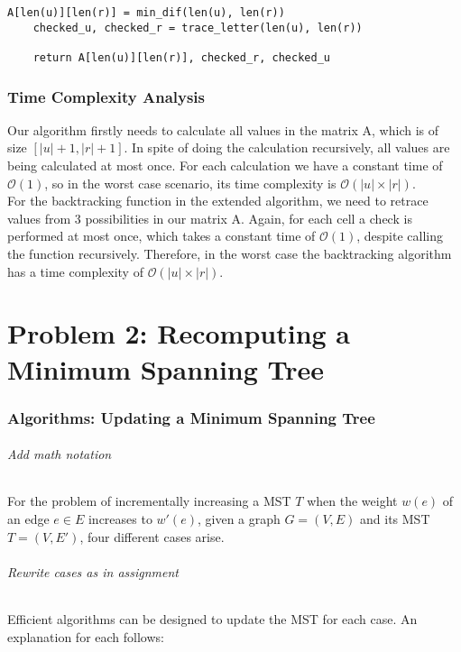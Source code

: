 \documentclass[a4paper,11pt]{article}
\begin{document}
\begin{lstlisting}[caption={Returning positioning},label={2nd1_2}]
    A[len(u)][len(r)] = min_dif(len(u), len(r))
    checked_u, checked_r = trace_letter(len(u), len(r))

    return A[len(u)][len(r)], checked_r, checked_u
\end{lstlisting}

\section{Time Complexity Analysis}

Our algorithm firstly needs to calculate all values in the matrix A, which is of size $[|u|+1,|r|+1]$. In spite of doing the calculation recursively, all values are being calculated at most once. For each calculation we have a constant time of $\mathcal{O}(1)$, so in the worst case scenario, its time complexity is $\mathcal{O}(|u|\times |r|)$.\\

For the backtracking function in the extended algorithm, we need to retrace values from 3 possibilities in our matrix A. Again, for each cell a check is performed at most once, which takes a constant time of $\mathcal{O}(1)$, despite calling the function recursively. Therefore, in the worst case the backtracking algorithm has a time complexity of $\mathcal{O}(|u|\times |r|)$.\\
\newpage

\part{Problem 2: Recomputing a Minimum Spanning Tree}
\section{Algorithms: Updating a Minimum Spanning Tree}
\paragraph{Add math notation}
For the problem of incrementally increasing a MST $T$ when the weight $w(e)$ of an edge $e\in E$ increases to $w'(e)$, given a graph $G=(V,E)$ and its MST $T=(V,E')$, four different cases arise.\\

\paragraph{Rewrite cases as in assignment}
Efficient algorithms can be designed to update the MST for each case. An explanation for each follows:
\end{document}
